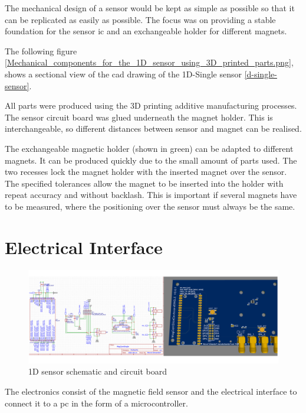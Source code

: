 The mechanical design of a sensor would be kept as simple as possible so
that it can be replicated as easily as possible. The focus was on
providing a stable foundation for the sensor \gls{ic} and an
exchangeable holder for different magnets.

The following figure
\ref{Mechanical_components_for_the_1D_sensor_using_3D_printed_parts.png},
shows a sectional view of the \gls{cad} drawing of the 1D-Single sensor
\ref{d-single-sensor}.

All parts were produced using the 3D printing additive manufacturing
processes. The sensor circuit board was glued underneath the magnet
holder. This is interchangeable, so different distances between sensor
and magnet can be realised.

The exchangeable magnetic holder (shown in green) can be adapted to
different magnets. It can be produced quickly due to the small amount of
parts used. The two recesses lock the magnet holder with the inserted
magnet over the sensor. The specified tolerances allow the magnet to be
inserted into the holder with repeat accuracy and without backlash. This
is important if several magnets have to be measured, where the
positioning over the sensor must always be the same.

\hypertarget{electrical-interface}{%
\section{Electrical Interface}\label{electrical-interface}}

\begin{figure}
\centering
\includegraphics{./generated_images/border_1D_sensor_schematic_and_circuit_board.png}
\caption{1D sensor schematic and circuit board
\label{1D_sensor_schematic_and_circuit_board.png}}
\end{figure}

The electronics consist of the magnetic field sensor and the electrical
interface to connect it to a \gls{pc} in the form of a microcontroller.

